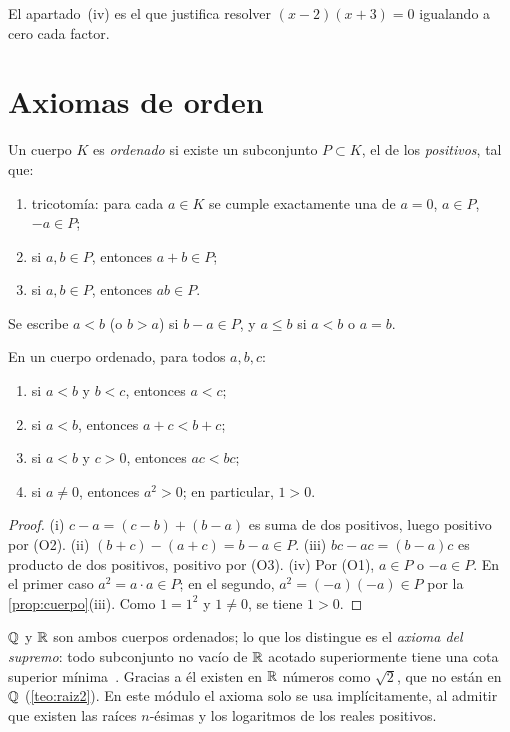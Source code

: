 El apartado~(iv) es el que justifica resolver $(x-2)(x+3)=0$ igualando a cero cada factor.

\section{Axiomas de orden}

\begin{definicion}\label{def:orden}
Un cuerpo $K$ es \emph{ordenado} si existe un subconjunto $P\subset K$, el de los \emph{positivos}, tal que:
\begin{enumerate}[label=(O\arabic*)]
  \item tricotomía: para cada $a\in K$ se cumple exactamente una de $a=0$, $a\in P$, $-a\in P$;
  \item si $a,b\in P$, entonces $a+b\in P$;
  \item si $a,b\in P$, entonces $ab\in P$.
\end{enumerate}
Se escribe $a<b$ (o $b>a$) si $b-a\in P$, y $a\le b$ si $a<b$ o $a=b$.
\end{definicion}

\begin{proposicion}\label{prop:orden}
En un cuerpo ordenado, para todos $a,b,c$:
\begin{enumerate}
  \item si $a<b$ y $b<c$, entonces $a<c$;
  \item si $a<b$, entonces $a+c<b+c$;
  \item si $a<b$ y $c>0$, entonces $ac<bc$;
  \item si $a\neq 0$, entonces $a^2>0$; en particular, $1>0$.
\end{enumerate}
\end{proposicion}

\begin{proof}
(i) $c-a=(c-b)+(b-a)$ es suma de dos positivos, luego positivo por (O2). (ii) $(b+c)-(a+c)=b-a\in P$. (iii) $bc-ac=(b-a)c$ es producto de dos positivos, positivo por (O3). (iv) Por (O1), $a\in P$ o $-a\in P$. En el primer caso $a^2=a\cdot a\in P$; en el segundo, $a^2=(-a)(-a)\in P$ por la \cref{prop:cuerpo}(iii). Como $1=1^2$ y $1\neq 0$, se tiene $1>0$.
\end{proof}

\begin{observacion}[La completitud]
$\mathbb{Q}$ y $\mathbb{R}$ son ambos cuerpos ordenados; lo que los distingue es el \emph{axioma del supremo}: todo subconjunto no vacío de $\mathbb{R}$ acotado superiormente tiene una cota superior mínima~\cite[cap.~8]{spivak}. Gracias a él existen en $\mathbb{R}$ números como $\sqrt 2$, que no están en $\mathbb{Q}$ (\cref{teo:raiz2}). En este módulo el axioma solo se usa implícitamente, al admitir que existen las raíces $n$-ésimas y los logaritmos de los reales positivos.
\end{observacion}

